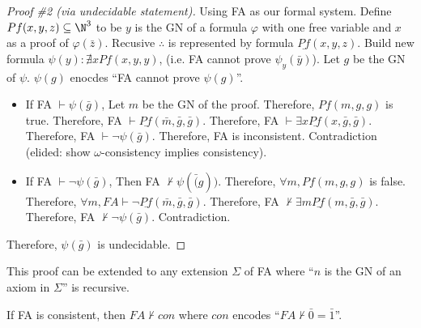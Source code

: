 \documentclass{article}
\begin{document}
\begin{theorem}
    \begin{proof}[Proof \#2 (via undecidable statement)]
        Using FA as our formal system.
        Define \(Pf(x,y,z)\subseteq\N^3\) to be
        \(y\) is the GN of a formula \(\varphi\) with one free variable
        and \(x\) as a proof of \(\varphi(\bar{z})\). 
        Recusive \(\therefore\) is represented by formula \(\underline{Pf}(x,y,z)\).
        Build new formula \(\psi(y):\nexists x Pf(x,y,y)\),
        (i.e. FA cannot prove \(\psi_y(\bar{y})\)).
        Let \(g\) be the GN of \(\psi\).
        \(\psi(g)\) enocdes ``FA cannot prove \(\psi(g)\)''.
        
        \begin{itemize}
            \item If FA \(\vdash \psi(\bar{g})\),
        Let \(m\) be the GN of the proof.
        Therefore, \(Pf(m,g,g)\) is true.
        Therefore, FA \(\vdash \underline{Pf}(\bar{m}, \bar{g}, \bar{g})\).
        Therefore, FA \(\vdash \exists x\underline{Pf}(x, \bar{g}, \bar{g})\).
        Therefore, FA \(\vdash \lnot\psi(\bar{g})\).
        Therefore, FA is inconsistent.
        Contradiction (elided: show \(\omega\)-consistency implies consistency).
            \item If FA \(\vdash \lnot\psi(\bar{g})\),
        Then FA \(\nvdash \psi(\bar(g))\).
        Therefore, \(\forall m, Pf(m,g,g)\) is false.
        Therefore, \(\forall m, FA \vdash \lnot\underline{Pf}(\bar{m}, \bar{g}, \bar{g})\).
        Therefore, FA \(\nvdash \exists m \underline{Pf}(m, \bar{g}, \bar{g})\).
        Therefore, FA \(\nvdash \lnot \psi(\bar{g})\).
        Contradiction.
        \end{itemize}
        Therefore, \(\psi(\bar{g})\) is undecidable.
    \end{proof}
    
    This proof can be extended to any extension \(\Sigma\) of FA
    where ``\(n\) is the GN of an axiom in \(\Sigma\)'' is recursive.
\end{theorem}
\begin{theorem}
    If FA is consistent,
    then \(FA \nvdash con\) where \(con\) encodes ``\(FA \nvdash \bar{0} = \bar{1}\)''.
\end{theorem}
\end{document}
